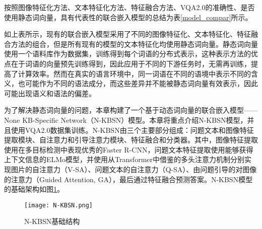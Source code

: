 按照图像特征化方法、文本特征化方法、特征融合方法、VQA2.0的准确性、是否使用静态词向量，具有代表性的联合嵌入模型的总结为表\ref{model_compar}所示。
\begin{table}[H]
\centering
\caption{代表性联合嵌入模型的比较}
\label{model_compar}
\end{table}

如上表所示，现有的联合嵌入模型采用了不同的图像特征化、文本特征化、特征融合方法的组合，但是所有现有的模型的文本特征化均使用静态词向量。静态词向量使用一个语料库作为数据集，训练得到每个词语的分布式表示，这种表示方法的优点在于词语的向量预先训练得到，因此应用于不同的下游任务时，无需再训练，提高了计算效率。然而在真实的语言环境中，同一词语在不同的语境中表示不同的含义，也可能作为不同的语法成分，而这些差异并不能被静态词向量有效表示，因此可能出现语义和语法的偏差。

为了解决静态词向量的问题，本章构建了一个基于动态词向量的联合嵌入模型——None KB-Specific Network（N-KBSN）模型。本章将重点介绍N-KBSN模型，并且使用VQA2.0数据集训练。N-KBSN由三个主要部分组成：问题文本和图像特征提取模块、自注意力和引导注意力模块、特征融合和分类器。其中，图像特征提取使用在多目标检测中表现优秀的Faster R-CNN，问题文本特征提取使用能够获得上下文信息的ELMo模型，并使用从Transformer中借鉴的多头注意力机制分别实现图片的自注意力（V-SA）、问题文本的自注意力（Q-SA）、由问题引导的对图像的注意力（Guided Attention, GA），最后通过特征融合预测答案。N-KBSN模型的基础架构如图\ref{N-KBSN}。
\begin{figure}[H]
	\texttt{[image: N-KBSN.png]}
	\caption{N-KBSN基础结构}
	\label{N-KBSN}
\end{figure}

